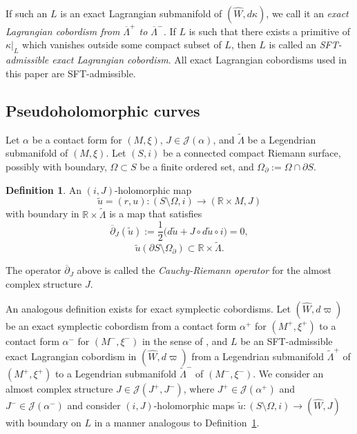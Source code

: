 \documentclass[10pt]{amsart}
\let\mathcal\mathscr
\let\wh\widehat
\theoremstyle{plain}
\theoremstyle{definition}
\newtheorem{defn}[thm]{Definition}
\numberwithin{equation}{subsection}
\begin{document}
If such an $L$ is an exact Lagrangian submanifold of $(\widehat W,d\kappa)$, we call it an {\em exact Lagrangian cobordism from $\overline{\Lambda}^+$ to $\overline{\Lambda}^-$.}
If $L$ is such that there exists a primitive of $\kappa |_L$ which vanishes outside some compact subset of $L$, then $L$ is called an \textit{SFT-admissible exact Lagrangian cobordism}. All exact Lagrangian cobordisms used in this paper are SFT-admissible.

\subsection{Pseudoholomorphic curves}

Let $\alpha$ be a contact form for $(M,\xi)$, $J \in \mathcal{J}(\alpha)$, and $\widetilde{\Lambda}$ be a Legendrian submanifold of $(M,\xi)$. Let $(S,i)$ be a connected compact Riemann surface, possibly with boundary, $\Omega \subset S$ be a finite ordered set, and $\Omega_{\partial} := \Omega \cap \partial S $.

\begin{defn} \label{defn: holo}
An $(i,J)$-holomorphic map
$$\widetilde{u}= (r,u):(S \setminus \Omega,i) \to (\mathbb{R} \times M,J)$$
with boundary in $\mathbb{R}\times \widetilde{\Lambda}$ is a map that satisfies
$$\overline{\partial}_J(\widetilde{u}):= \frac{1}{2}\big(d\widetilde{u} + J \circ d\widetilde{u} \circ i \big)=0,$$
$$\widetilde{u}(\partial S \setminus \Omega_{\partial}) \subset \mathbb{R}\times \widetilde{\Lambda}.$$
\end{defn}

The operator $\overline{\partial}_J$ above is called the {\em Cauchy-Riemann operator} for the almost complex structure $J$.

An analogous definition exists for exact symplectic cobordisms. Let $(\wh W,d\varpi)$ be an exact symplectic cobordism from a contact form $\alpha^+$ for $(M^+,\xi^+)$ to a contact form $\alpha^-$ for $(M^-,\xi^-)$ in the sense of \cite{CPT}, and $L$ be an SFT-admissible exact Lagrangian cobordism in $(\wh W,d\varpi)$ from a Legendrian submanifold $\widetilde{\Lambda}^+$ of $(M^+,\xi^+)$ to a Legendrian submanifold $\widetilde{\Lambda}^-$ of $(M^-,\xi^-)$.
We consider an almost complex structure $J \in \mathcal{J}(J^+,J^-)$, where $J^+ \in \mathcal{J}(\alpha^+)$ and $J^- \in \mathcal{J}(\alpha^-)$ and consider $(i,J)$-holomorphic maps $\widetilde{u}: (S\setminus \Omega,i)\to (\widehat {W},J)$ with boundary on $L$ in a manner analogous to Definition~\ref{defn: holo}.
\end{document}
